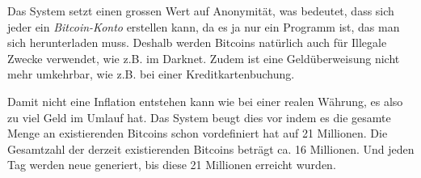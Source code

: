 \noindent
Das System setzt einen grossen Wert auf Anonymität, was bedeutet, dass sich jeder ein \emph{\dq Bitcoin-Konto \dq} erstellen kann, da es ja nur ein
Programm ist, das man sich herunterladen muss. Deshalb werden Bitcoins natürlich auch für Illegale Zwecke verwendet, wie z.B. im Darknet. Zudem ist eine
Geldüberweisung nicht mehr umkehrbar, wie z.B. bei einer Kreditkartenbuchung.

\noindent
Damit nicht eine Inflation entstehen kann wie bei einer realen Währung, es also zu viel Geld im Umlauf hat. Das System beugt dies vor indem es die gesamte Menge
an existierenden Bitcoins schon vordefiniert hat auf 21 Millionen. Die Gesamtzahl der derzeit existierenden Bitcoins beträgt ca. 16 Millionen. Und jeden Tag werden
neue generiert, bis diese 21 Millionen erreicht wurden.

\newpage
